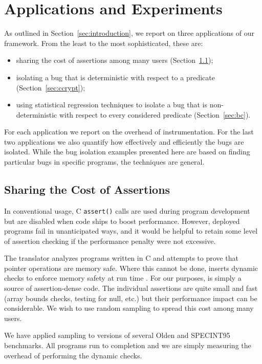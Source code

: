 \section{Applications and Experiments}
\label{sec:applications}

As outlined in Section~\ref{sec:introduction}, we report on three
applications of our framework.  From the least to the most sophisticated,
these are:
\begin{itemize}
\item sharing the cost of assertions among many users (Section~\ref{sec:ccured});

\item isolating a bug that is deterministic with respect to a predicate
(Section~\ref{sec:ccrypt});

\item using statistical regression techniques to isolate a bug that is non-deterministic with respect to every considered predicate (Section~\ref{sec:bc}).
\end{itemize}
For each application we report on the overhead of instrumentation.
For the last two applications we also quantify how effectively and efficiently
the bugs are isolated.  While the bug isolation examples presented here
are based on finding particular bugs in specific programs, 
the techniques are general.


\subsection{Sharing the Cost of Assertions}
\label{sec:ccured}

In conventional usage, C \texttt{assert()} calls are used during
program development but are disabled when code 
ships to boost performance.  However, deployed programs fail in
unanticipated ways, and it would be helpful to retain some level of
assertion checking if the performance penalty were not excessive.

The \CCured translator analyzes programs written in C and
attempts to prove that pointer operations are memory
safe.  Where this cannot be done, \CCured inserts dynamic checks to
enforce memory safety at run time \cite{POPL_'02*128}.  For our purposes, 
\CCured is simply a source of assertion-dense code.
The individual assertions are quite small and fast (array bounds
checks, testing for null, etc.)  but their performance impact can be
considerable.  We wish to use random sampling to spread this cost
among many users.

We have applied sampling to \CCured versions of several Olden
\cite{Carlisle:1996:OPPWDDSDMM} and SPECINT95 \cite{SPEC95} benchmarks.
All programs run to completion and we are simply measuring
the overhead of performing the dynamic checks.

